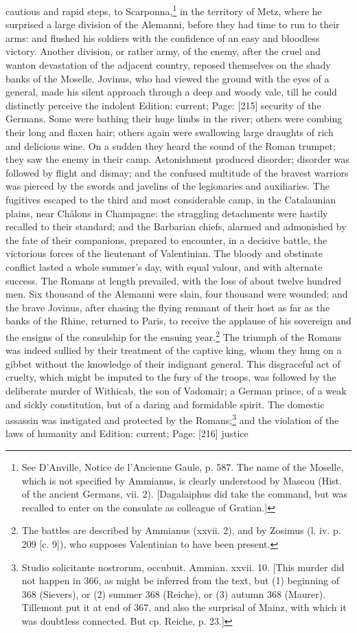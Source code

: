 cautious and rapid steps, to Scarponna,\footnote{See D\texthebrew{}’Anville, Notice de l\texthebrew{}’Ancienne Gaule, p. 587. The name of the Moselle, which is not specified by Ammianus, is clearly understood by Mascou (Hist. of the ancient Germans, vii. 2). [Dagalaiphus did take the command, but was recalled to enter on the consulate as colleague of Gratian.]} in the territory of Metz, where he surprised a large division of the Alemanni, before they had time to run to their arms: and flushed his soldiers with the confidence of an easy and bloodless victory. Another division, or rather army, of the enemy, after the cruel and wanton devastation of the adjacent country, reposed themselves on the shady banks of the Moselle. Jovinus, who had viewed the ground with the eyes of a general, made his silent approach through a deep and woody vale, till he could distinctly perceive the indolent Edition: current; Page: [215] security of the Germans. Some were bathing their huge limbs in the river; others were combing their long and flaxen hair; others again were swallowing large draughts of rich and delicious wine. On a sudden they heard the sound of the Roman trumpet; they saw the enemy in their camp. Astonishment produced disorder; disorder was followed by flight and dismay; and the confused multitude of the bravest warriors was pierced by the swords and javelins of the legionaries and auxiliaries. The fugitives escaped to the third and most considerable camp, in the Catalaunian plains, near Châlons in Champagne: the straggling detachments were hastily recalled to their standard; and the Barbarian chiefs, alarmed and admonished by the fate of their companions, prepared to encounter, in a decisive battle, the victorious forces of the lieutenant of Valentinian. The bloody and obstinate conflict lasted a whole summer\texthebrew{}’s day, with equal valour, and with alternate success. The Romans at length prevailed, with the loss of about twelve hundred men. Six thousand of the Alemanni were slain, four thousand were wounded; and the brave Jovinus, after chasing the flying remnant of their host as far as the banks of the Rhine, returned to Paris, to receive the applause of his sovereign and the ensigns of the consulship for the ensuing year.\footnote{The battles are described by Ammianus (xxvii. 2), and by Zosimus (l. iv. p. 209 [c. 9]), who supposes Valentinian to have been present.} The triumph of the Romans was indeed sullied by their treatment of the captive king, whom they hung on a gibbet without the knowledge of their indignant general. This disgraceful act of cruelty, which might be imputed to the fury of the troops, was followed by the deliberate murder of Withicab, the son of Vadomair; a German prince, of a weak and sickly constitution, but of a daring and formidable spirit. The domestic assassin was instigated and protected by the Romans;\footnote{Studio solicitante nostrorum, occubuit. Ammian. xxvii. 10. [This murder did not happen in 366, as might be inferred from the text, but (1) beginning of 368 (Sievers), or (2) summer 368 (Reiche), or (3) autumn 368 (Maurer). Tillemont put it at end of 367, and also the surprisal of Mainz, with which it was doubtless connected. But cp. Reiche, p. 23.]} and the violation of the laws of humanity and Edition: current; Page: [216] justice 